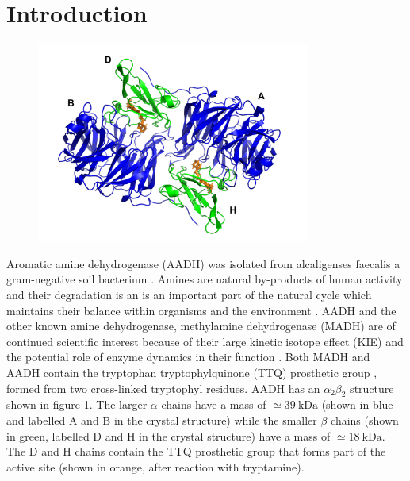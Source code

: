 \section{Introduction}
\begin{figure}
    \centering
    \includegraphics[width=0.8\textwidth]{chapters/aadh/figures/aadh_full_structure.png}
    \label{fig:aadh_full_structure}
\end{figure}

Aromatic amine dehydrogenase (AADH) was isolated from alcaligenses faecalis \cite{nozakiAromaticAmineDehydrogenase1987} a gram-negative soil bacterium \cite{govindarajAromaticAmineDehydrogenase1994a}. Amines are natural by-products of human activity and their degradation is an is an important part of the natural cycle which maintains their balance within organisms and the environment \cite{chistoserdovCloningSequencingMutagenesis2001}. AADH and the other known amine dehydrogenase, methylamine dehydrogenase (MADH) are of continued scientific interest because of their large kinetic isotope effect (KIE) \cite{hyunUnusuallyLargeIsotope1995a}\cite{basranImportanceBarrierShape2001a}\cite{basranEnzymaticHTransferRequires1999}  and the potential role of enzyme dynamics in their function \cite{mcgeaghProteinDynamicsEnzyme2011}\cite{glowackiProteinDynamicsEnzyme2012a}\cite{glowackiTakingOckhamRazor2012b}. Both MADH and AADH contain the tryptophan tryptophylquinone (TTQ) prosthetic group \cite{govindarajAromaticAmineDehydrogenase1994a}\cite{McIntire817}, formed from two cross-linked tryptophyl residues. AADH has an $\alpha_{2}\beta_{2}$ structure shown in figure \ref{fig:aadh_full_structure}. The larger $\alpha$ chains have a mass of $\simeq \SI{39}{\kilo\dalton}$ (shown in blue and labelled A and B in the crystal structure) while the smaller $\beta$ chains (shown in green, labelled D and H in the crystal structure) have a mass of $\simeq \SI{18}{\kilo\dalton}$. The D and H chains contain the TTQ prosthetic group that forms part of the active site (shown in orange, after reaction with tryptamine). 

